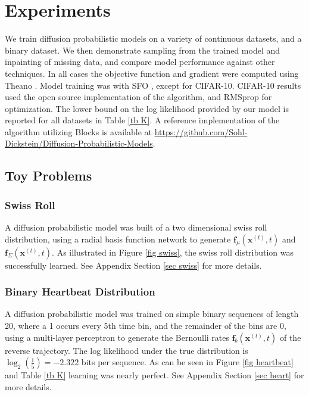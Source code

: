 \documentclass{article}
\newcommand{\mb}{\mathbf}
\begin{document}
\section{Experiments}
\label{sec results}

We train diffusion probabilistic models on a variety of continuous datasets, and a binary dataset.
We then demonstrate sampling from the trained model and inpainting of missing data, and compare model performance against other techniques. 
In all cases the objective function and gradient were computed using Theano \cite{Bergstra2010}. Model training was with SFO \cite{sohl2014fast}, except for CIFAR-10. CIFAR-10 results used the open source implementation of the algorithm, and RMSprop for optimization.
The lower bound on the log likelihood provided by our model is reported for all datasets 
in Table \ref{tb K}.
A reference implementation of the algorithm utilizing Blocks \cite{Merrienboer2015} is available at \url{https://github.com/Sohl-Dickstein/Diffusion-Probabilistic-Models}.

\subsection{Toy Problems}

\subsubsection{Swiss Roll}

A diffusion  probabilistic model was built of a two dimensional swiss roll distribution, using a radial basis function network to generate
$\mb f_\mu\left( \mb x^{(t)}, t \right)$ and $\mb f_\Sigma\left( \mb x^{(t)}, t \right)$.
As illustrated in Figure \ref{fig swiss}, the swiss roll distribution was successfully learned. 
See Appendix Section \ref{sec swiss} for more details.

\subsubsection{Binary Heartbeat Distribution}

A diffusion  probabilistic model was trained on simple binary sequences of length 20, where a 1 occurs every 5th time bin, and the remainder of the bins are 0,
using a multi-layer perceptron to generate the Bernoulli rates $\mb f_b\left( \mb x^{(t)}, t \right)$ of the reverse trajectory.
The log likelihood under the true distribution is 
$\log_2\left( \frac{1}{5} \right) = -2.322$ bits per sequence.  As can be seen in Figure \ref{fig heartbeat} and Table \ref{tb K} learning was nearly perfect.
See Appendix Section \ref{sec heart} for more details.
\end{document}

